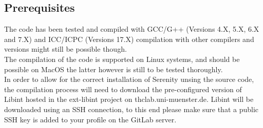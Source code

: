 \documentclass[bibliography=totocnumbered,a4paper,10pt]{scrartcl}
\begin{document}
\subsection{Prerequisites}

The code has been tested and compiled with GCC/G++ (Versions 4.X, 5.X, 6.X and 7.X)
and ICC/ICPC (Versions 17.X) compilation with other compilers and versions might still
be possible though.\\

The compilation of the code is supported on Linux systems, and should be possible on MacOS
the latter however is still to be tested thoroughly.\\

In order to allow for the correct installation of Serenity unsing the source code, 
the compilation process will need to download the pre-configured version of Libint hosted 
in the ext-libint project on thclab.uni-muenster.de.
Libint will be downloaded using an SSH connection, to this end please make sure that
a public SSH key is added to your profile on the GitLab server.\\
\end{document}
